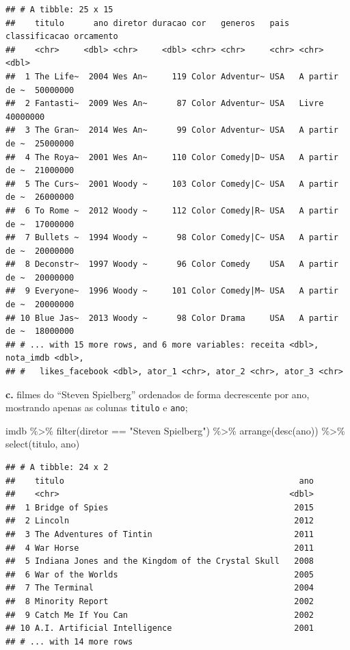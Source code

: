\documentclass[
]{book}
\newenvironment{Shaded}{\begin{snugshade}}{\end{snugshade}}
\newcommand{\FunctionTok}[1]{\textcolor[rgb]{0.00,0.00,0.00}{#1}}
\newcommand{\NormalTok}[1]{#1}
\newcommand{\SpecialCharTok}[1]{\textcolor[rgb]{0.00,0.00,0.00}{#1}}
\newcommand{\StringTok}[1]{\textcolor[rgb]{0.31,0.60,0.02}{#1}}
\begin{document}
\begin{verbatim}
## # A tibble: 25 x 15
##    titulo      ano diretor duracao cor   generos   pais  classificacao orcamento
##    <chr>     <dbl> <chr>     <dbl> <chr> <chr>     <chr> <chr>             <dbl>
##  1 The Life~  2004 Wes An~     119 Color Adventur~ USA   A partir de ~  50000000
##  2 Fantasti~  2009 Wes An~      87 Color Adventur~ USA   Livre          40000000
##  3 The Gran~  2014 Wes An~      99 Color Adventur~ USA   A partir de ~  25000000
##  4 The Roya~  2001 Wes An~     110 Color Comedy|D~ USA   A partir de ~  21000000
##  5 The Curs~  2001 Woody ~     103 Color Comedy|C~ USA   A partir de ~  26000000
##  6 To Rome ~  2012 Woody ~     112 Color Comedy|R~ USA   A partir de ~  17000000
##  7 Bullets ~  1994 Woody ~      98 Color Comedy|C~ USA   A partir de ~  20000000
##  8 Deconstr~  1997 Woody ~      96 Color Comedy    USA   A partir de ~  20000000
##  9 Everyone~  1996 Woody ~     101 Color Comedy|M~ USA   A partir de ~  20000000
## 10 Blue Jas~  2013 Woody ~      98 Color Drama     USA   A partir de ~  18000000
## # ... with 15 more rows, and 6 more variables: receita <dbl>, nota_imdb <dbl>,
## #   likes_facebook <dbl>, ator_1 <chr>, ator_2 <chr>, ator_3 <chr>
\end{verbatim}

\textbf{c.} filmes do ``Steven Spielberg'' ordenados de forma decrescente por ano, mostrando apenas as colunas \texttt{titulo} e \texttt{ano};

\begin{Shaded}
\begin{Highlighting}[]
\NormalTok{imdb }\SpecialCharTok{\%\textgreater{}\%} 
  \FunctionTok{filter}\NormalTok{(diretor }\SpecialCharTok{==} \StringTok{"Steven Spielberg"}\NormalTok{) }\SpecialCharTok{\%\textgreater{}\%} 
  \FunctionTok{arrange}\NormalTok{(}\FunctionTok{desc}\NormalTok{(ano)) }\SpecialCharTok{\%\textgreater{}\%} 
  \FunctionTok{select}\NormalTok{(titulo, ano)}
\end{Highlighting}
\end{Shaded}

\begin{verbatim}
## # A tibble: 24 x 2
##    titulo                                                ano
##    <chr>                                               <dbl>
##  1 Bridge of Spies                                      2015
##  2 Lincoln                                              2012
##  3 The Adventures of Tintin                             2011
##  4 War Horse                                            2011
##  5 Indiana Jones and the Kingdom of the Crystal Skull   2008
##  6 War of the Worlds                                    2005
##  7 The Terminal                                         2004
##  8 Minority Report                                      2002
##  9 Catch Me If You Can                                  2002
## 10 A.I. Artificial Intelligence                         2001
## # ... with 14 more rows
\end{verbatim}
\end{document}
